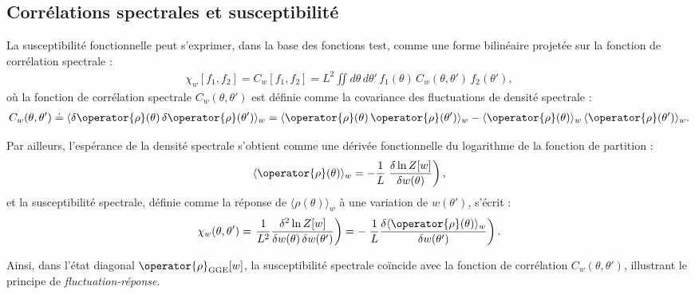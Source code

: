 \subsection{Corrélations spectrales et susceptibilité}


La susceptibilité fonctionnelle peut s’exprimer, dans la base des fonctions test, comme une forme bilinéaire projetée sur la fonction de corrélation spectrale :
\begin{eqnarray*}
\chi_w[f_1, f_2] = C_w[f_1, f_2] = L^2 \iint d\theta\, d\theta'\, f_1(\theta)\, C_w(\theta, \theta')\, f_2(\theta'),
\end{eqnarray*}
où la fonction de corrélation spectrale \( C_w(\theta, \theta') \) est définie comme la covariance des fluctuations de densité spectrale :
\begin{eqnarray*}
C_w(\theta, \theta') \doteq \langle \delta \operator{\rho}(\theta)\, \delta \operator{\rho}(\theta') \rangle_w = \langle \operator{\rho}(\theta)\, \operator{\rho}(\theta') \rangle_w - \langle \operator{\rho}(\theta) \rangle_w\, \langle \operator{\rho}(\theta') \rangle_w.
\end{eqnarray*}

Par ailleurs, l’espérance de la densité spectrale s’obtient comme une dérivée fonctionnelle du logarithme de la fonction de partition :
\begin{eqnarray*}
\langle \operator{\rho}(\theta) \rangle_w = - \frac{1}{L} \left. \frac{\delta \ln Z[w]}{\delta w(\theta)} \right),
\end{eqnarray*}
et la susceptibilité spectrale, définie comme la réponse de \( \langle \rho(\theta) \rangle_w \) à une variation de \( w(\theta') \), s’écrit :
\begin{eqnarray*}
\chi_w(\theta, \theta') = \left. \frac{1}{L^2} \frac{\delta^2 \ln Z[w]}{\delta w(\theta)\, \delta w(\theta')} \right) = - \left. \frac{1}{L} \frac{\delta \langle \operator{\rho}(\theta) \rangle_w}{\delta w(\theta')} \right).
\end{eqnarray*}

Ainsi, dans l’état diagonal \( \operator{\rho}_{\mathrm{GGE}}[w] \), la susceptibilité spectrale coïncide avec la fonction de corrélation \( C_w(\theta, \theta') \), illustrant le principe de \emph{fluctuation-réponse}.

